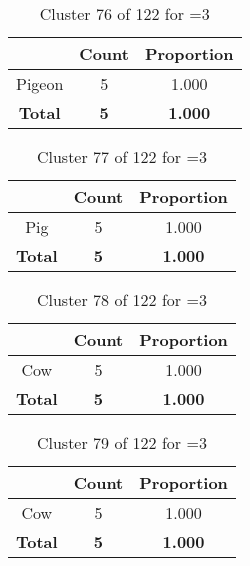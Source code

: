 \begin{table}[ht!]
\centering
\begin{tabular}{|c|c|c|}
\hline
\bf \Spec{} &\bf Count &\bf Proportion\\ \hline \hline
Pigeon & 5 & 1.000\\ \hline
\hline
\bf Total & \bf 5 & \bf 1.000\\ \hline
\end{tabular}
\label{tab:cluster:76:3}
\caption{Cluster 76 of 122 for \minneigh{}=3}
\end{table}

\begin{table}[ht!]
\centering
\begin{tabular}{|c|c|c|}
\hline
\bf \Spec{} &\bf Count &\bf Proportion\\ \hline \hline
Pig & 5 & 1.000\\ \hline
\hline
\bf Total & \bf 5 & \bf 1.000\\ \hline
\end{tabular}
\label{tab:cluster:77:3}
\caption{Cluster 77 of 122 for \minneigh{}=3}
\end{table}

\begin{table}[ht!]
\centering
\begin{tabular}{|c|c|c|}
\hline
\bf \Spec{} &\bf Count &\bf Proportion\\ \hline \hline
Cow & 5 & 1.000\\ \hline
\hline
\bf Total & \bf 5 & \bf 1.000\\ \hline
\end{tabular}
\label{tab:cluster:78:3}
\caption{Cluster 78 of 122 for \minneigh{}=3}
\end{table}

\begin{table}[ht!]
\centering
\begin{tabular}{|c|c|c|}
\hline
\bf \Spec{} &\bf Count &\bf Proportion\\ \hline \hline
Cow & 5 & 1.000\\ \hline
\hline
\bf Total & \bf 5 & \bf 1.000\\ \hline
\end{tabular}
\label{tab:cluster:79:3}
\caption{Cluster 79 of 122 for \minneigh{}=3}
\end{table}

